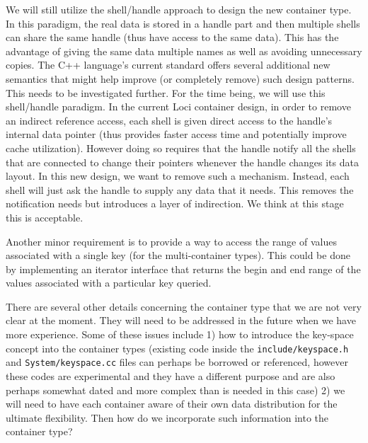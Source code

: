 \documentclass{article}
\begin{document}
We will still utilize the shell/handle approach to design the new
container type.  In this paradigm, the real data is stored in a handle
part and then multiple shells can share the same handle (thus have
access to the same data).  This has the advantage of giving the same
data multiple names as well as avoiding unnecessary copies.  The C++
language's current standard offers several additional new semantics that
might help improve (or completely remove) such design patterns.  This
needs to be investigated further.  For the time being, we will use this
shell/handle paradigm.  In the current Loci container design, in order
to remove an indirect reference access, each shell is given direct
access to the handle's internal data pointer (thus provides faster
access time and potentially improve cache utilization).  However doing
so requires that the handle notify all the shells that are connected to
change their pointers whenever the handle changes its data layout.  In
this new design, we want to remove such a mechanism.  Instead, each
shell will just ask the handle to supply any data that it needs.  This
removes the notification needs but introduces a layer of indirection.
We think at this stage this is acceptable.

Another minor requirement is to provide a way to access the range of
values associated with a single key (for the multi-container types).
This could be done by implementing an iterator interface that returns
the begin and end range of the values associated with a particular key
queried.

There are several other details concerning the container type that we
are not very clear at the moment.  They will need to be addressed in the
future when we have more experience.  Some of these issues include 1)
how to introduce the key-space concept into the container types
(existing code inside the \texttt{include/keyspace.h} and
\texttt{System/keyspace.cc} files can perhaps be borrowed or referenced,
however these codes are experimental and they have a different purpose
and are also perhaps somewhat dated and more complex than is needed in
this case) 2) we will need to have each container aware of their own
data distribution for the ultimate flexibility.  Then how do we
incorporate such information into the container type?
\end{document}
